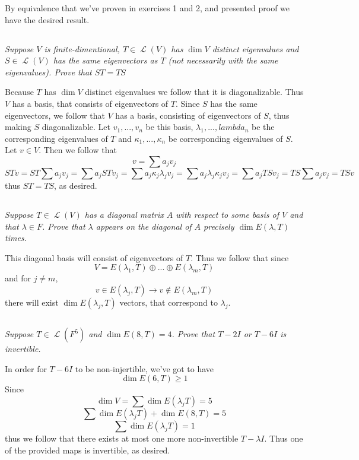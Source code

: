 \documentclass[11pt,oneside,titlepage]{book}
\DeclareMathOperator \map {\mathcal {L}}
\begin{document}
By equivalence that we've proven in exercises 1 and 2, and presented proof we have the desired
result.

\subsection{}

\textit{Suppose $V$ is finite-dimentional, $T \in \map(V)$ has $\dim V$ distinct
  eigenvalues and $S \in \map(V)$ has the same eigenvectors as $T$ (not necessarily with the
  same eigenvalues). Prove that $ST = TS$}

Because $T$ has $\dim V$ distinct eigenvalues we follow that it is diagonalizable. Thus
$V$ has a basis, that consists of eigenvectors of $T$. Since
$S$ has the same eigenvectors, we follow that $V$ has a basis, consisting of eigenvectors of $S$,
thus making $S$ diagonalizable. Let $v_1, ..., v_n$ be this basis, $\lambda_1, ..., lambda_n$
be the corresponding eigenvalues of $T$ and $\kappa_1, ..., \kappa_n$ be corresponding
eigenvalues of $S$. Let $v \in V$. Then we follow that
$$v = \sum{a_j v_j}$$
$$ST v = ST \sum{a_j v_j} = \sum{a_j ST v_j} = \sum{a_j \kappa_j \lambda_j  v_j} =
\sum{a_j  \lambda_j \kappa_j  v_j} = \sum{a_j  TS v_j} = TS \sum{a_j v_j} = TSv$$
thus $ST = TS$, as desired.

\subsection{}

\textit{Suppose $T \in \map(V)$ has a diagonal matrix $A$ with respect to some basis of $V$
  and that $\lambda \in F$. Prove that $\lambda$ appears on the diagonal of $A$ precisely
  $\dim E(\lambda,  T)$ times.}

This diagonal basis will consist of eigenvectors of $T$. Thus we follow that since
$$V = E(\lambda_1, T) \oplus ... \oplus E(\lambda_m, T)$$
and for $j \neq m$, 
$$v \in E(\lambda_j, T) \to v \notin E(\lambda_m, T)$$
there will exist $\dim E(\lambda_j, T)$ vectors, that correspond to $\lambda_j$.

\subsection{}

\textit{Suppose $T \in \map(F^5)$ and $\dim E(8, T) = 4$. Prove that $T - 2I$ or $T - 6I$
  is invertible.}

In order for $T - 6I$ to be non-injertible, we've got to have
$$\dim E(6, T) \geq 1$$
Since
$$\dim V = \sum{\dim E(\lambda_j T)} = 5$$
$$\sum{\dim E(\lambda_j T)} + \dim E(8, T) = 5$$
$$\sum{\dim E(\lambda_j T)}  = 1$$
thus we follow that there exists at most one more non-invertible $T - \lambda I$. Thus one of the
provided maps is invertible, as desired.
\end{document}
